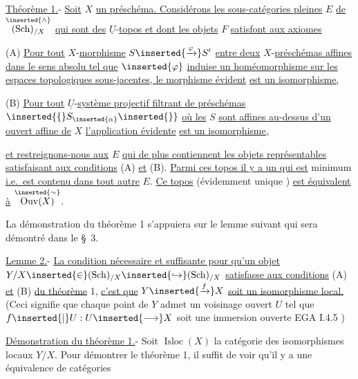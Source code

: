 
\uline{Théorème 1.}- \uline{Soit} $X$ \uline{un préschéma. Considérons les sous-catégories pleines} $E$ \uline{de} $\overset{\inserted{\wedge}}{(\mathrm{Sch})_{/X}}$ \uline{qui sont des} $\underline{U}$-\uline{topos et dont les objets} $F$ \uline{satisfont aux axiomes}

(A) \uline{Pour tout} $X$-\uline{morphisme} $S\inserted{\xrightarrow{\varphi}}S'$ \uline{entre deux} $X$-\uline{préschémas affines dans le sens absolu tel que} $\inserted{\varphi}$ \uline{induise un homéomorphisme sur les espaces topologiques sous-jacentes, le morphisme évident}
\uline{est un isomorphisme,}

(B) \uline{Pour tout} $\underline{U}$-\uline{système projectif filtrant de préschémas} $\inserted{\{}S_{\inserted{\alpha}}\inserted{\}}$ \uline{où les} $S$ \uline{sont affines au-dessus d'un ouvert affine de} $X$ \uline{l'application évidente}
\uline{est un isomorphisme,}

\uline{et restreignons-nous aux} $E$ \uline{qui de plus contiennent les objets représentables satisfaisant aux conditions} (A) \uline{et} (B). \uline{Parmi ces topos il y a un qui est} minimum \uline{i.e.\ est contenu dans tout autre} $E$. \uline{Ce topos} (évidemment unique ) \uline{est équivalent à} $\overset{\inserted{\sim}}{\operatorname{Ouv}(X)}$.

La démonstration du théorème 1 s'appuiera sur le lemme suivant qui sera démontré dans le \S\ 3.

\uline{Lemme 2.}- \uline{La condition nécessaire et suffisante pour qu'un objet} $Y/X\inserted{\in}(\mathrm{Sch})_{/X}\inserted{\hookrightarrow}(\mathrm{Sch})_{/X}$ \uline{satisfasse aux conditions} (A) \uline{et} (B) \uline{du théorème} 1, \uline{c'est que} $Y\inserted{\xrightarrow{f}}X$ \uline{soit un isomorphisme local.}
(Ceci signifie que chaque point de $Y$ admet un voisinage ouvert $U$ tel que $f\inserted{|}U:U\inserted{\longrightarrow}X$ soit une immersion ouverte \inserted{[}EGA I.4.5\inserted{]} )

\uline{Démonstration du théorème 1.}- Soit $\operatorname{Isloc}(X)$ la catégorie des isomorphismes locaux $Y/X$. Pour démontrer le théorème 1, il suffit de voir qu'il y a une équivalence de catégories
